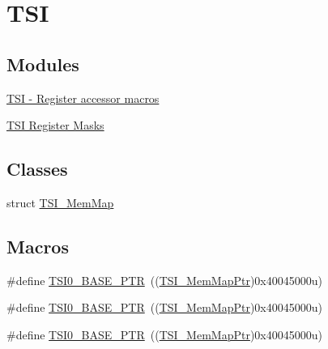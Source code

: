 \hypertarget{group___t_s_i___peripheral}{}\section{T\+SI}
\label{group___t_s_i___peripheral}
\subsection*{Modules}
\begin{DoxyCompactItemize}
\item 
\hyperlink{group___t_s_i___register___accessor___macros}{T\+S\+I -\/ Register accessor macros}
\item 
\hyperlink{group___t_s_i___register___masks}{T\+S\+I Register Masks}
\end{DoxyCompactItemize}
\subsection*{Classes}
\begin{DoxyCompactItemize}
\item 
struct \hyperlink{struct_t_s_i___mem_map}{T\+S\+I\+\_\+\+Mem\+Map}
\end{DoxyCompactItemize}
\subsection*{Macros}
\begin{DoxyCompactItemize}
\item 
\#define \hyperlink{group___t_s_i___peripheral_gaf98ea1cd15559446e0cfc1ae177751f6}{T\+S\+I0\+\_\+\+B\+A\+S\+E\+\_\+\+P\+TR}~((\hyperlink{group___t_s_i___peripheral_gad1310fedc6b594554cdd760e371de570}{T\+S\+I\+\_\+\+Mem\+Map\+Ptr})0x40045000u)
\item 
\#define \hyperlink{group___t_s_i___peripheral_gaf98ea1cd15559446e0cfc1ae177751f6}{T\+S\+I0\+\_\+\+B\+A\+S\+E\+\_\+\+P\+TR}~((\hyperlink{group___t_s_i___peripheral_gad1310fedc6b594554cdd760e371de570}{T\+S\+I\+\_\+\+Mem\+Map\+Ptr})0x40045000u)
\item 
\#define \hyperlink{group___t_s_i___peripheral_gaf98ea1cd15559446e0cfc1ae177751f6}{T\+S\+I0\+\_\+\+B\+A\+S\+E\+\_\+\+P\+TR}~((\hyperlink{group___t_s_i___peripheral_gad1310fedc6b594554cdd760e371de570}{T\+S\+I\+\_\+\+Mem\+Map\+Ptr})0x40045000u)
\end{DoxyCompactItemize}
